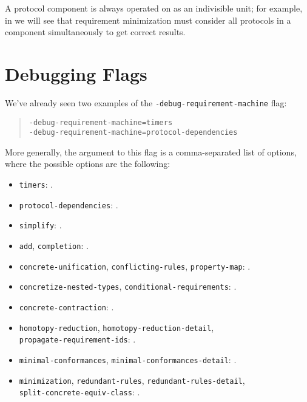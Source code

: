 \documentclass[../generics]{subfiles}
\begin{document}
A protocol component is always operated on as an indivisible unit; for example, in  we will see that requirement minimization must consider all protocols in a component simultaneously to get correct results.

\section{Debugging Flags}\label{rqm debugging flags}

We've already seen two examples of the \texttt{-debug-requirement-machine} flag:
\begin{quote}
\begin{verbatim}
-debug-requirement-machine=timers
-debug-requirement-machine=protocol-dependencies
\end{verbatim}
\end{quote}
More generally, the argument to this flag is a comma-separated list of options, where the possible options are the following:
\begin{itemize}
\item \texttt{timers}: .
\item \texttt{protocol-dependencies}: .
\item \texttt{simplify}: .
\item \texttt{add}, \texttt{completion}: .
\item \texttt{concrete-unification}, \texttt{conflicting-rules}, \texttt{property-map}: .
\item \texttt{concretize-nested-types}, \texttt{conditional-requirements}: .
\item \texttt{concrete-contraction}: .
\item \texttt{homotopy-reduction}, \texttt{homotopy-reduction-detail},\\
\texttt{propagate-requirement-ids}: .
\item \texttt{minimal-conformances}, \texttt{minimal-conformances-detail}: .
\item \texttt{minimization},  \texttt{redundant-rules}, \texttt{redundant-rules-detail},\\
\texttt{split-concrete-equiv-class}: .
\end{itemize}
\end{document}

